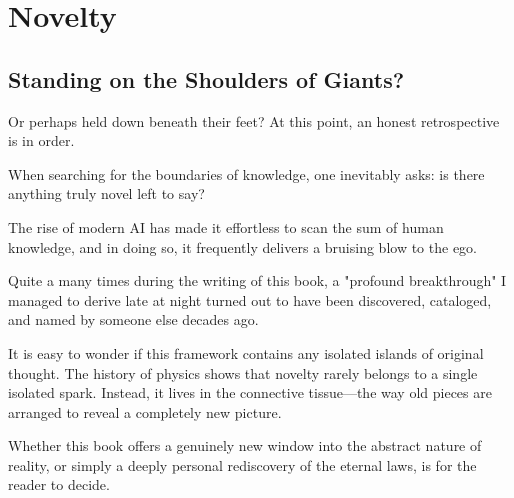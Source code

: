 \chapter{Novelty}
\label{chap:novelty}

\section{Standing on the Shoulders of Giants?}

Or perhaps held down beneath their feet? At this point, an honest retrospective is in order. 

When searching for the boundaries of knowledge, one inevitably asks:
is there anything truly novel left to say?

The rise of modern AI has made it effortless to scan the sum of human knowledge, and in doing so,
it frequently delivers a bruising blow to the ego.

Quite a many times during the writing of this book, a "profound breakthrough" I managed to derive late at night turned out to have been discovered, cataloged, and named by someone else decades ago. 

It is easy to wonder if this framework contains any isolated islands of original thought.
The history of physics shows that novelty rarely belongs to a single isolated spark.
Instead, it lives in the connective tissue—the way old pieces are arranged to reveal a completely new picture.

Whether this book offers a genuinely new window into the abstract nature of reality, or simply a deeply personal rediscovery of the eternal laws, is for the reader to decide.

